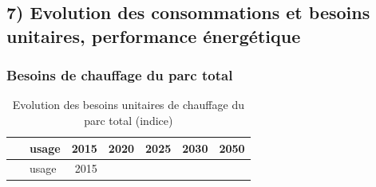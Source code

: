 \documentclass[]{article}
\begin{document}
\subsection{7) Evolution des consommations et besoins unitaires,
performance
énergétique}\label{evolution-des-consommations-et-besoins-unitaires-performance-energetique}

\subsubsection{Besoins de chauffage du parc
total}\label{besoins-de-chauffage-du-parc-total}

\begin{longtable}[]{@{}clrrrrr@{}}
\caption{Evolution des besoins unitaires de chauffage du parc total
(indice)}\tabularnewline
\toprule
\begin{minipage}[b]{0.19\columnwidth}\centering\strut
~\strut
\end{minipage} & \begin{minipage}[b]{0.13\columnwidth}\raggedright\strut
usage\strut
\end{minipage} & \begin{minipage}[b]{0.08\columnwidth}\raggedleft\strut
2015\strut
\end{minipage} & \begin{minipage}[b]{0.08\columnwidth}\raggedleft\strut
2020\strut
\end{minipage} & \begin{minipage}[b]{0.08\columnwidth}\raggedleft\strut
2025\strut
\end{minipage} & \begin{minipage}[b]{0.08\columnwidth}\raggedleft\strut
2030\strut
\end{minipage} & \begin{minipage}[b]{0.08\columnwidth}\raggedleft\strut
2050\strut
\end{minipage}\tabularnewline
\midrule
\endfirsthead
\toprule
\begin{minipage}[b]{0.19\columnwidth}\centering\strut
~\strut
\end{minipage} & \begin{minipage}[b]{0.13\columnwidth}\raggedright\strut
usage\strut
\end{minipage} & \begin{minipage}[b]{0.08\columnwidth}\raggedleft\strut
2015\strut
\end{minipage} & \begin{minipage}[b]{0.08\columnwidth}\raggedleft\strut

\end{minipage}
\end{longtable}
\end{document}
